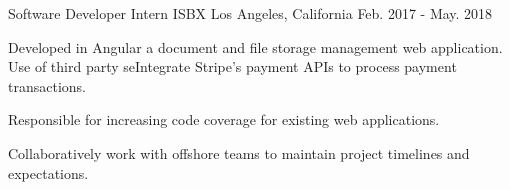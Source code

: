 \begin{cventries}
  \cventry
    {Software Developer Intern} %
    {ISBX} %
    {Los Angeles, California} %
    {Feb. 2017 - May. 2018} %
    {
      \begin{cvitems} %
        \item {Developed in Angular a document and file storage management web application. Use of third party seIntegrate Stripe's payment APIs to process payment transactions.}
        \item {Responsible for increasing code coverage for existing web applications. }
        \item {Collaboratively work with offshore teams to maintain project timelines and expectations.}
      \end{cvitems}
    }

\end{cventries}
